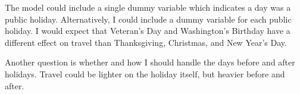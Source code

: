 \documentclass[]{book}
\newenvironment{Shaded}{\begin{snugshade}}{\end{snugshade}}
\newcommand{\DataTypeTok}[1]{\textcolor[rgb]{0.13,0.29,0.53}{#1}}
\newcommand{\DecValTok}[1]{\textcolor[rgb]{0.00,0.00,0.81}{#1}}
\newcommand{\FloatTok}[1]{\textcolor[rgb]{0.00,0.00,0.81}{#1}}
\newcommand{\KeywordTok}[1]{\textcolor[rgb]{0.13,0.29,0.53}{\textbf{#1}}}
\newcommand{\NormalTok}[1]{#1}
\newcommand{\OperatorTok}[1]{\textcolor[rgb]{0.81,0.36,0.00}{\textbf{#1}}}
\newcommand{\OtherTok}[1]{\textcolor[rgb]{0.56,0.35,0.01}{#1}}
\newcommand{\StringTok}[1]{\textcolor[rgb]{0.31,0.60,0.02}{#1}}
\theoremstyle{plain}
\theoremstyle{remark}
\begin{document}
The model could include a single dummy variable which indicates a day was a public holiday.
Alternatively, I could include a dummy variable for each public holiday.
I would expect that Veteran's Day and Washington's Birthday have a different effect on travel than Thanksgiving, Christmas, and New Year's Day.

Another question is whether and how I should handle the days before and after holidays.
Travel could be lighter on the holiday itself,
but heavier before and after.

\begin{Shaded}
\end{Shaded}
\end{document}
